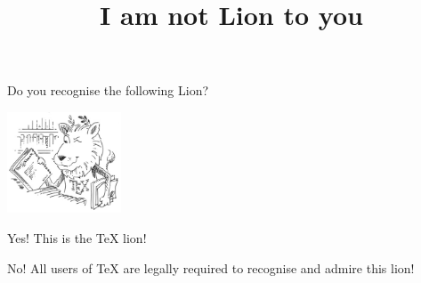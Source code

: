 \documentclass{webquiz}
\title{I am not Lion to you}
\begin{document}
\begin{question}
  Do you recognise the following Lion?
  \begin{center}
      \includegraphics[height=30mm]{ctanLion}
  \end{center}

  \begin{choice}
    \correct Yes!
    \response This is the \TeX{} lion!

    \incorrect No!
    \response All users of \TeX{} are legally required to recognise and
    admire this lion!
  \end{choice}
\end{question}
\end{document}
